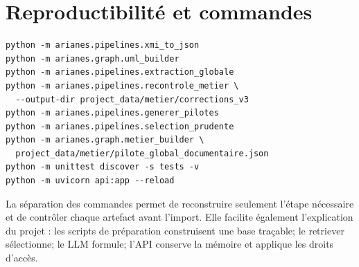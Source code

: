 \section{Reproductibilité et commandes}

\begin{lstlisting}[caption={Commandes principales depuis la racine}]
python -m arianes.pipelines.xmi_to_json
python -m arianes.graph.uml_builder
python -m arianes.pipelines.extraction_globale
python -m arianes.pipelines.recontrole_metier \
  --output-dir project_data/metier/corrections_v3
python -m arianes.pipelines.generer_pilotes
python -m arianes.pipelines.selection_prudente
python -m arianes.graph.metier_builder \
  project_data/metier/pilote_global_documentaire.json
python -m unittest discover -s tests -v
python -m uvicorn api:app --reload
\end{lstlisting}

La séparation des commandes permet de reconstruire seulement l'étape nécessaire et de
contrôler chaque artefact avant l'import. Elle facilite également l'explication du projet :
les scripts de préparation construisent une base traçable; le retriever sélectionne; le LLM
formule; l'API conserve la mémoire et applique les droits d'accès.
